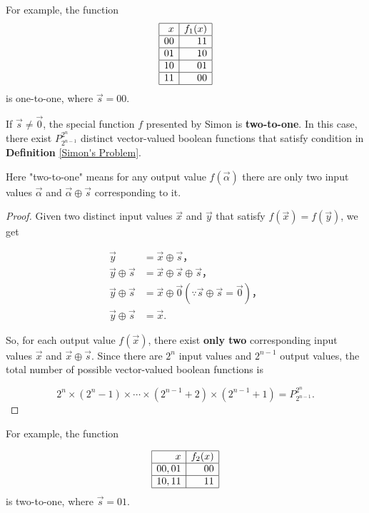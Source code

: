 For example, the function 
$$
\begin{array}{|r|r|}
	\hline x & f_1(x) \\
	\hline 00 & 11 \\
	\hline 01 & 10 \\
	\hline 10 & 01 \\
	\hline 11 & 00 \\
	\hline
\end{array}
$$
is one-to-one, where $\vec{s}=00$.

\begin{property}
If $\vec{s} \neq \vec{0}$, the special function $f$ presented by Simon is \textbf{two-to-one}. In this case, there exist $P^{2^n}_{2^{n-1}}$ distinct vector-valued boolean functions that satisfy condition in \textbf{Definition} \ref{Simon's Problem}.
\end{property}

\begin{mdframed}
Here "two-to-one" means for any output value $f(\vec{\alpha})$ there are only two input values $\vec{\alpha}$ and $\vec{\alpha} \oplus \vec{s}$ corresponding to it.
\end{mdframed}

\begin{proof}
Given two distinct input values $\vec{x}$ and $\vec{y}$ that satisfy $f(\vec{x}) = f(\vec{y})$, we get

$$
\begin{aligned}
	\vec{y} & =\vec{x} \oplus \vec{s}， \\
	\vec{y} \oplus \vec{s} & =\vec{x} \oplus \vec{s} \oplus \vec{s}， \\
	\vec{y} \oplus \vec{s} & =\vec{x} \oplus \vec{0}(\because \vec{s} \oplus \vec{s}=\vec{0})， \\
	\vec{y} \oplus \vec{s} & =\vec{x}.
\end{aligned}
$$

So, for each output value $f(\vec{x})$, there exist \textbf{only two} corresponding input values $\vec{x}$ and $\vec{x} \oplus \vec{s}$. Since there are $2^n$ input values and $2^{n-1}$ output values, the total number of possible vector-valued boolean functions is

$$
2^n \times (2^n-1) \times \cdots \times (2^{n-1}+2) \times (2^{n-1}+1) = P^{2^n}_{2^{n-1}}.
$$
\end{proof}

For example, the function 

$$
\begin{array}{|r|r|}
	\hline x & f_2(x) \\
	\hline 00,01 & 00 \\
	\hline 10,11 & 11 \\
	\hline
\end{array}
$$
is two-to-one, where $\vec{s}=01$.